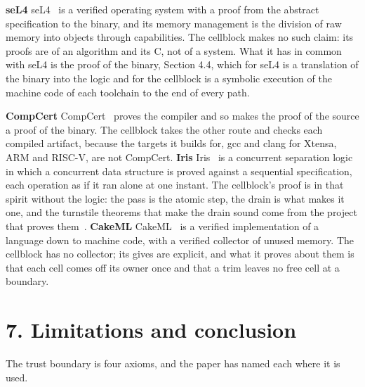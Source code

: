 \textbf{seL4} seL4~\cite{src:seL4} is a verified operating system with a proof from the abstract specification to the binary, and its memory management is the division of raw memory into objects through capabilities. The cellblock makes no such claim: its proofs are of an algorithm and its C, not of a system. What it has in common with seL4 is the proof of the binary, Section 4.4, which for seL4 is a translation of the binary into the logic and for the cellblock is a symbolic execution of the machine code of each toolchain to the end of every path.

\textbf{CompCert} CompCert~\cite{src:CompCert} proves the compiler and so makes the proof of the source a proof of the binary. The cellblock takes the other route and checks each compiled artifact, because the targets it builds for, gcc and clang for Xtensa, ARM and RISC-V, are not CompCert. \textbf{Iris} Iris~\cite{src:Iris} is a concurrent separation logic in which a concurrent data structure is proved against a sequential specification, each operation as if it ran alone at one instant. The cellblock's proof is in that spirit without the logic: the pass is the atomic step, the drain is what makes it one, and the turnstile theorems that make the drain sound come from the project that proves them~\cite{src:Turnstile}. \textbf{CakeML} CakeML~\cite{src:CakeML} is a verified implementation of a language down to machine code, with a verified collector of unused memory. The cellblock has no collector; its gives are explicit, and what it proves about them is that each cell comes off its owner once and that a trim leaves no free cell at a boundary.

\section{\texorpdfstring{7. Limitations and conclusion}{7. Limitations and conclusion}}

The trust boundary is four axioms, and the paper has named each where it is used.

